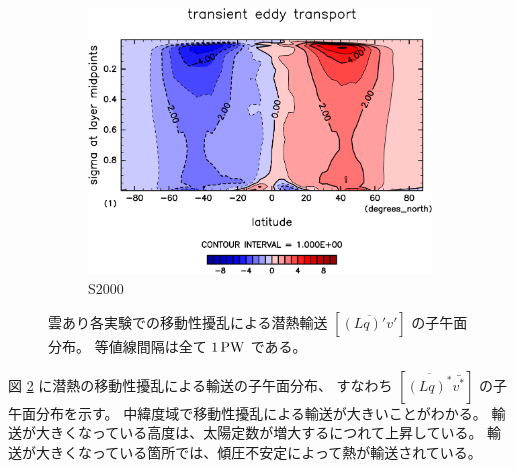 \documentclass[body]{subfiles}
\begin{document}
\begin{figure}[t]
\begin{subfigure}{.4\textwidth}
		\includegraphics[width=\textwidth]{S2000/MeriHeatTransTest@latentEn_TE,time=7300:7665-crop-rotate.pdf}
		\caption{S2000}\label{潜熱移動性擾乱S2000}
	\end{subfigure}
	\caption[雲あり各実験での移動性擾乱による潜熱輸送の子午面分布]{
		雲あり各実験での移動性擾乱による潜熱輸送 \([\overline{(Lq)'v'}]\) の子午面分布。
		等値線間隔は全て \(1\hmu{PW}\) である。
	}\label{潜熱移動性擾乱}
\end{figure}

図 \ref{潜熱移動性擾乱} に潜熱の移動性擾乱による輸送の子午面分布、
すなわち \([\overline{(Lq)^*}\bar{v^*}]\) の子午面分布を示す。
中緯度域で移動性擾乱による輸送が大きいことがわかる。
輸送が大きくなっている高度は、太陽定数が増大するにつれて上昇している。
輸送が大きくなっている箇所では、傾圧不安定によって熱が輸送されている。
\end{document}
